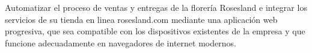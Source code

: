 Automatizar el proceso de ventas y entregas de la florería Rosesland e integrar los servicios de su tienda en linea rosesland.com mediante una aplicación web progresiva, que sea compatible con los dispositivos existentes de la empresa y que funcione adecuadamente en navegadores de internet modernos.